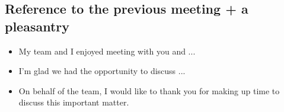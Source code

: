 \subsection{Reference to the previous meeting + a pleasantry}
\begin{itemize}
\item My team and I enjoyed meeting with you and ...
\item I'm glad we had the opportunity to discuss ...
\item On behalf of the team, I would like to thank you for making up time to discuss this important matter.
\end{itemize}